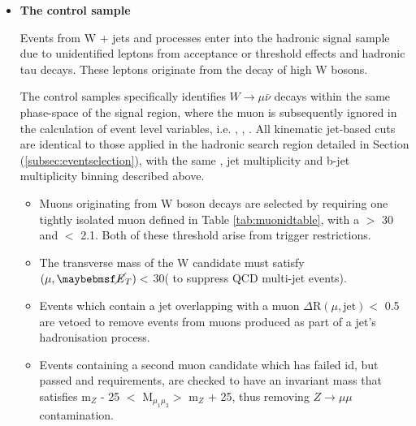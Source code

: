\begin{itemize} 

\item[] \textbf{The \mupjets control sample}

Events from W + jets and \ttbar processes enter into the hadronic signal sample due to unidentified leptons from acceptance or threshold effects and hadronic tau decays. These leptons originate from the decay of high \pt W bosons. 

The control samples specifically identifies $W \rightarrow \mu\bar{\nu}$ decays within the same phase-space of the signal region, where the muon is subsequently ignored in the calculation of event level variables, i.e. \theht, \mht, \alphat. All kinematic jet-based cuts are identical to those applied in the hadronic search region detailed in Section (\ref{subsec:eventselection}), with the same \theht, jet multiplicity and b-jet multiplicity binning described above.

\begin{itemize}
\item Muons originating from W boson decays are selected by requiring one tightly isolated muon defined in Table \ref{tab:muonidtable}, with a \pt $>$ 30 \GeV and \abeta $<$ 2.1. Both of these threshold arise from trigger restrictions.  
\item The transverse mass of the W candidate must satisfy \mt$(\mu,\met) <$ 30\GeV ( to suppress QCD multi-jet events). 
\item Events which contain a jet overlapping with a muon $\Delta \text{R}(\mu,\text{jet}) <$ 0.5 are vetoed to remove events from muons produced as part of a jet's hadronisation process. 
\item Events containing a second muon candidate which has failed id, but passed \pt and \abeta requirements, are checked to have an invariant mass that satisfies m$_{Z}$ - 25 $<$ M$_{\mu_{1}\mu_{2}} >$ m$_{Z}$ + 25, thus removing $Z \rightarrow \mu\mu$ contamination.
\end{itemize}



\end{itemize}
